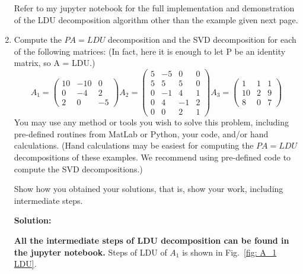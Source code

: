 \documentclass[conference,onecolumn]{IEEEtran}
\begin{document}
\begin{enumerate}[label=\arabic{enumi}.]
          Refer to my jupyter notebook for the full implementation and demonstration of the LDU decomposition algorithm other than the example given next page.

          \clearpage
    \item Compute the $PA = LDU$ decomposition and the SVD decomposition for each of the following matrices: (In fact, here it is enough to let P be an identity matrix, so A = LDU.)
          \begin{equation*}
              A_1 =
              \begin{pmatrix}
                  10 & -10 & 0  \\
                  0  & -4  & 2  \\
                  2  & 0   & -5
              \end{pmatrix}
              A_2 =
              \begin{pmatrix}
                  5 & -5 & 0  & 0 \\
                  5 & 5  & 5  & 0 \\
                  0 & -1 & 4  & 1 \\
                  0 & 4  & -1 & 2 \\
                  0 & 0  & 2  & 1
              \end{pmatrix}
              A_3 =
              \begin{pmatrix}
                  1  & 1 & 1 \\
                  10 & 2 & 9 \\
                  8  & 0 & 7
              \end{pmatrix}
          \end{equation*}
          You may use any method or tools you wish to solve this problem, including pre-defined
          routines from MatLab or Python, your code, and/or hand calculations.
          (Hand calculations may be easiest for computing the $PA = LDU$ decompositions of these examples. We recommend using pre-defined code to compute the SVD decompositions.)

          Show how you obtained your solutions, that is, show your work, including intermediate steps.

          \textbf{Solution:}

          \textbf{All the intermediate steps of LDU decomposition can be found in the jupyter notebook.}
          Steps of LDU of $A_1$ is shown in Fig.~\ref{fig: A_1 LDU}.


\end{enumerate}
\end{document}
